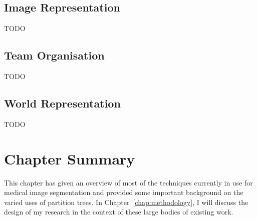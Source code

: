 \subsection{Image Representation}

TODO

\subsection{Team Organisation}

TODO

\subsection{World Representation}

TODO

\section{Chapter Summary}

This chapter has given an overview of most of the techniques currently in use for medical image segmentation and provided some important background on the varied uses of partition trees. In Chapter~\ref{chap:methodology}, I will discuss the design of my research in the context of these large bodies of existing work.
